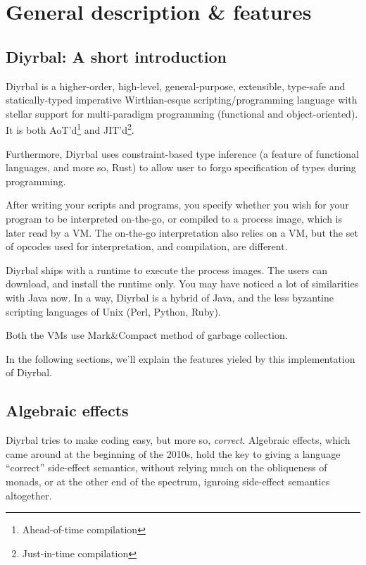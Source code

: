 \documentclass[a4paper,12pt]{article}
\newcommand{\nm}{Diyrbal\xspace}
\newcommand{\gcmeth}{Mark\&Compact\xspace}
\begin{document}
\section{General description \& features}

\subsection{\nm: A short introduction}

\nm is a higher-order, high-level, general-purpose, extensible, type-safe and statically-typed imperative Wirthian-esque scripting/programming language with stellar support for multi-paradigm programming (functional and object-oriented). It is both AoT'd\footnote{Ahead-of-time compilation} and JIT'd\footnote{Just-in-time compilation}.

Furthermore, \nm uses constraint-based type inference (a feature of functional languages, and more so, Rust) to allow user to forgo specification of types during programming.

After writing your scripts and programs, you specify whether you wish for your program to be interpreted on-the-go, or compiled to a process image, which is later read by a VM. The on-the-go interpretation also relies on a VM, but the set of opcodes used for interpretation, and compilation, are different.

\nm ships with a runtime to execute the process images. The users can download, and install the runtime only. You may have noticed a lot of similarities with Java now. In a way, \nm is a hybrid of Java, and the less byzantine scripting languages of Unix (Perl, Python, Ruby).

Both the VMs use \gcmeth method of garbage collection. %

In the following sections, we'll explain the features yieled by this implementation of \nm.

\subsection{Algebraic effects}

\nm tries to make coding easy, but more so, \textit{correct}. Algebraic effects, which came around at the beginning of the 2010s, hold the key to giving a language ``correct'' side-effect semantics, without relying much on the obliqueness of monads, or at the other end of the spectrum, ignroing side-effect semantics altogether.
\end{document}

